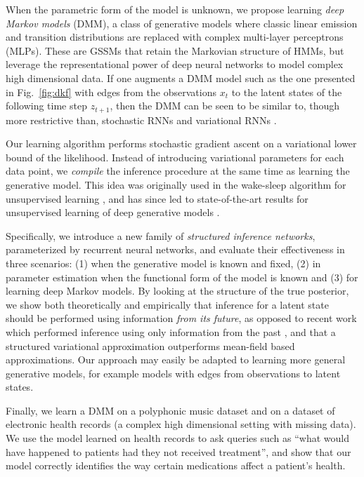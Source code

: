 \documentclass[letterpaper]{article}
\theoremstyle{plain}
\newcommand{\DKF}{DMM\xspace}
\newcommand{\DMM}{DMM\xspace}
\begin{document}
When the parametric form of the model is unknown, 
we propose learning {\em deep Markov models} (\DKF), a class of generative models 
where classic linear emission and
transition distributions 
are replaced with complex multi-layer perceptrons (MLPs).
These are GSSMs that retain the 
Markovian structure of HMMs, but
leverage the representational power of deep neural 
networks to model complex high dimensional data. 
If one augments a \DKF model such as the one presented in Fig.~\ref{fig:dkf} with edges from the observations $x_t$
to the latent states of the following time step $z_{t+1}$, then the \DKF 
 can be seen to be similar to, though more restrictive than, stochastic RNNs \cite{bayer2014learning} and variational RNNs
\cite{chung2015recurrent}.

Our learning algorithm performs stochastic gradient ascent on
a variational lower bound of the likelihood. 
Instead of introducing
variational parameters for each data point, we {\em compile} the
inference procedure at the same time as learning the generative model. 
This idea was originally used in the wake-sleep algorithm for
unsupervised learning \cite{hinton1995wake}, and has since led to 
state-of-the-art results for unsupervised learning of deep
generative models \cite{kingma2013auto,mnih2014neural,rezende2014stochastic}. 

Specifically, we introduce a new family of {\em structured
 inference networks}, parameterized by recurrent neural networks, and
evaluate their effectiveness in three scenarios: 
(1) when the generative model is known and fixed, 
(2) in parameter estimation when the functional form of the model is known 
and (3) for learning deep Markov models.
By looking at the structure of the true posterior, we show both
theoretically and empirically that inference for a latent state should
be performed using information \emph{from its future}, as opposed to
recent work which performed inference using only information from the
past \cite{chung2015recurrent,gan2015deep,gregor2015draw}, and that a
structured variational approximation outperforms mean-field based approximations.
Our approach may easily be 
adapted to learning more general generative models, for example models
with edges from observations to latent states.  

Finally, we learn a \DMM on a polyphonic music dataset and on a dataset of
electronic health records (a complex high dimensional setting with missing data). We use the model learned on health records to ask queries such as ``what would have happened to patients had they not received treatment'', and show that our model correctly identifies the way certain medications affect a patient's health.
\end{document}
